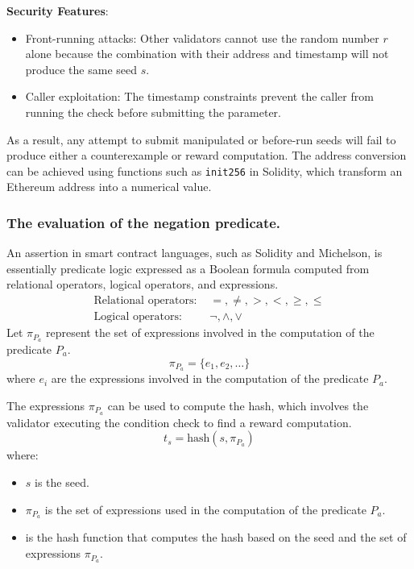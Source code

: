 \documentclass[runningheads]{llncs}
\begin{document}
\textbf{Security Features}:
\begin{itemize}
    \item Front-running attacks: Other validators cannot use the random number $r$ alone because the combination with their address and timestamp will not produce the same seed $s$.
    \item Caller exploitation: The timestamp constraints prevent the caller from running the check before submitting the parameter.
\end{itemize}
As a result, any attempt to submit manipulated or before-run seeds will fail to produce either a counterexample or reward computation. The address conversion can be achieved using functions such as \lstinline|init256| in Solidity, which transform an Ethereum address into a numerical value. 

\subsubsection{The evaluation of the negation predicate.} An assertion in smart contract languages, such as Solidity and Michelson, is essentially predicate logic expressed as a Boolean formula computed from relational operators, logical operators, and expressions. 
\begin{align}
\text{Relational operators: } & =, \neq, >, <, \geq, \leq \\
\text{Logical operators: } & \neg, \land, \lor
\end{align}
Let $\pi_{P_{a}}$ represent the set of expressions involved in the computation of the predicate $P_a$.
\begin{equation}
\pi_{P_{a}} = \{ e_1, e_2, \ldots \}
\end{equation}
where $e_i$ are the expressions involved in the computation of the predicate $P_a$.

 The expressions $\pi_{P_a}$ can be used to compute the hash, which involves the validator executing the condition check to find a reward computation.
\begin{equation}
t_s = \text{hash}(s, \pi_{P_{a}})
\end{equation}
where:
\begin{itemize}
    \item $s$ is the seed.
    \item $\pi_{P_{a}}$ is the set of expressions used in the computation of the predicate $P_a$.
    \item {} is the hash function that computes the hash based on the seed and the set of expressions $\pi_{P_{a}}$.
\end{itemize}
\end{document}

